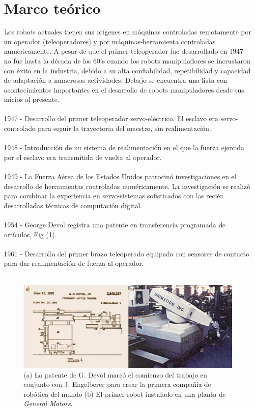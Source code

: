 \section{Marco teórico}

Los robots actuales tienen sus orígenes en máquinas controladas remotamente por un operador (teleoperadores) y por máquinas-herramienta controladas numéricamente. A pesar de que el primer teleoperador fue desarrollado en 1947 no fue hasta la década de los 60's cuando los robots manipuladores se incrustaron con éxito en la industria, debido a su alta confiabilidad, repetibilidad y capacidad de adaptación a numerosas actividades. Debajo se encuentra una lista con acontecimientos importantes en el desarrollo de robots manipuladores desde sus inicios al presente.\\\\
1947 - Desarrollo del primer teleoperador servo-eléctrico. El esclavo era servo-controlado para seguir la trayectoria del maestro, sin realimentación.\\\\
1948 - Introducción de un sistema de realimentación en el que la fuerza ejercida por el esclavo era transmitida de vuelta al operador.\\\\
1949 - La Fuerza Aérea de los Estados Unidos patrocinó investigaciones en el desarrollo de herramientas controladas numéricamente. La investigación se realizó para combinar la experiencia en servo-sistemas sofisticados con las recién desarrolladas técnicas de computación digital.\\\\
1954 - George Devol registra una patente en transferencia programada de artículos, Fig (\ref{unimation}).\\\\
1961 - Desarrollo del primer brazo teleoperado equipado con sensores de contacto para dar realimentación de fuerza al operador.\\\\
\begin{figure}[h!]
	\centering
	\includegraphics[scale=0.4]{Capitulo1/figs/Unimation.PNG} 
	\caption{(a) La patente de G. Devol marcó el comienzo del trabajo en conjunto con J. Engelberer para crear la primera compañía de robótica del mundo (b) El primer robot instalado en una planta de \textit{General Motors}.}
	\label{unimation}
\end{figure}\\
